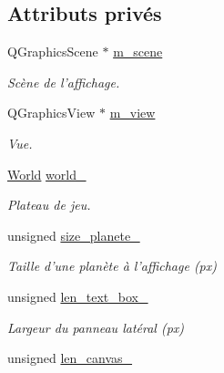 \subsection*{Attributs privés}
\begin{DoxyCompactItemize}
\item 
\hypertarget{classDisplayer_a2b3b84d51d4bb077d52ede2a2abc6191}{Q\-Graphics\-Scene $\ast$ \hyperlink{classDisplayer_a2b3b84d51d4bb077d52ede2a2abc6191}{m\-\_\-scene}}\label{classDisplayer_a2b3b84d51d4bb077d52ede2a2abc6191}

\begin{DoxyCompactList}\small\item\em Scène de l'affichage. \end{DoxyCompactList}\item 
\hypertarget{classDisplayer_a793b9f323b4d24428f1376528b537515}{Q\-Graphics\-View $\ast$ \hyperlink{classDisplayer_a793b9f323b4d24428f1376528b537515}{m\-\_\-view}}\label{classDisplayer_a793b9f323b4d24428f1376528b537515}

\begin{DoxyCompactList}\small\item\em Vue. \end{DoxyCompactList}\item 
\hypertarget{classDisplayer_acf5e0801f0353ad1300ea901f8038fb5}{\hyperlink{classWorld}{World} \hyperlink{classDisplayer_acf5e0801f0353ad1300ea901f8038fb5}{world\-\_\-}}\label{classDisplayer_acf5e0801f0353ad1300ea901f8038fb5}

\begin{DoxyCompactList}\small\item\em Plateau de jeu. \end{DoxyCompactList}\item 
\hypertarget{classDisplayer_abf6048109c2f782b47932babc1c72b79}{unsigned \hyperlink{classDisplayer_abf6048109c2f782b47932babc1c72b79}{size\-\_\-planete\-\_\-}}\label{classDisplayer_abf6048109c2f782b47932babc1c72b79}

\begin{DoxyCompactList}\small\item\em Taille d'une planète à l'affichage (px) \end{DoxyCompactList}\item 
\hypertarget{classDisplayer_aedcdc7b40771c068fb70f9f74b2d6689}{unsigned \hyperlink{classDisplayer_aedcdc7b40771c068fb70f9f74b2d6689}{len\-\_\-text\-\_\-box\-\_\-}}\label{classDisplayer_aedcdc7b40771c068fb70f9f74b2d6689}

\begin{DoxyCompactList}\small\item\em Largeur du panneau latéral (px) \end{DoxyCompactList}\item 
\hypertarget{classDisplayer_aff59f7de619d0d84e91aaf6087b55ebc}{unsigned \hyperlink{classDisplayer_aff59f7de619d0d84e91aaf6087b55ebc}{len\-\_\-canvas\-\_\-}}\label{classDisplayer_aff59f7de619d0d84e91aaf6087b55ebc}


\end{DoxyCompactItemize}
